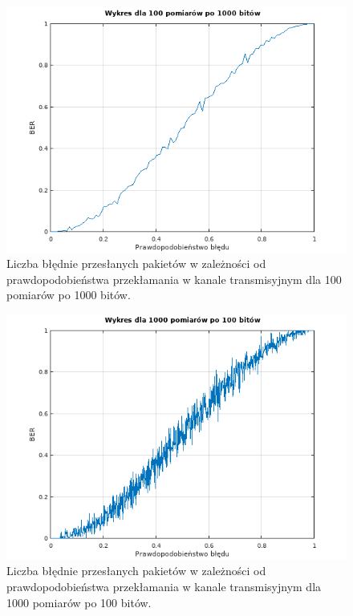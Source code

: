 \documentclass[12pt,a4paper,notitlepage]{report}
\begin{document}
    \begin{figure}[H]
        \centering       
        \includegraphics[width=\textwidth]{100_po_1000.png}
        \caption{Liczba błędnie przesłanych pakietów w zależności od prawdopodobieństwa przekłamania w kanale transmisyjnym dla 100 pomiarów po 1000 bitów.}
        \label{fig:obrazek 100_po_1000}
    \end{figure}
    \begin{figure}[H]
        \centering       
        \includegraphics[width=\textwidth]{1000_po_100.png}
        \caption{Liczba błędnie przesłanych pakietów w zależności od prawdopodobieństwa przekłamania w kanale transmisyjnym dla 1000 pomiarów po 100 bitów.}
        \label{fig:obrazek 1000_po_100}
    \end{figure}
\end{document}
